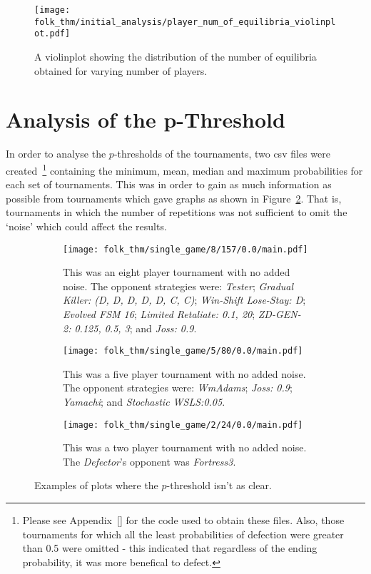 \begin{figure}      
    \centering
    \texttt{[image: folk\_thm/initial\_analysis/player\_num\_of\_equilibria\_violinplot.pdf]}
    \caption{A violinplot showing the distribution of the number of equilibria obtained for varying number of players.}\label{fig:NE_violinplot}
\end{figure}



\section{Analysis of the p-Threshold}\label{sec:Analysis_of_the_p-Threshold}
In order to analyse the \(p\)-thresholds of the tournaments, two csv files were
created~\footnote{Please see Appendix~\ref{} for the code used to obtain these
files. Also, those tournaments for which all the least probabilities of
defection were greater than 0.5 were omitted - this indicated that regardless of
the ending probability, it was more benefical to defect.} containing the
minimum, mean, median and maximum probabilities for each set of tournaments.
This was in order to gain as much information as possible from tournaments which
gave graphs as shown in Figure~\ref{fig:less_clear}. That is, tournaments in
which the number of repetitions was not sufficient to omit the `noise' which
could affect the results.

\begin{figure}
    \begin{subfigure}{.3\textwidth}
        \centering
        \texttt{[image: folk\_thm/single\_game/8/157/0.0/main.pdf]}
        \caption{This was an eight player tournament with no added noise. The opponent strategies were: \textit{Tester}; \textit{Gradual Killer: (D, D, D, D, D, C, C)}; \textit{Win-Shift Lose-Stay: D}; \textit{Evolved FSM 16}; \textit{Limited Retaliate: 0.1, 20}; \textit{ZD-GEN-2: 0.125, 0.5, 3}; and \textit{Joss: 0.9}.}
    \end{subfigure}
    \begin{subfigure}{.3\textwidth}
        \centering
        \texttt{[image: folk\_thm/single\_game/5/80/0.0/main.pdf]}
        \caption{This was a five player tournament with no added noise. The opponent strategies were: \textit{WmAdams}; \textit{Joss: 0.9}; \textit{Yamachi}; and \textit{Stochastic WSLS:\@ 0.05}.}
    \end{subfigure}
    \begin{subfigure}{.3\textwidth}
        \centering
        \texttt{[image: folk\_thm/single\_game/2/24/0.0/main.pdf]}
        \caption{This was a two player tournament with no added noise. The \textit{Defector}'s opponent was \textit{Fortress3}.}
    \end{subfigure}
    \caption{Examples of plots where the \(p\)-threshold isn't as clear.}\label{fig:less_clear}
\end{figure}

